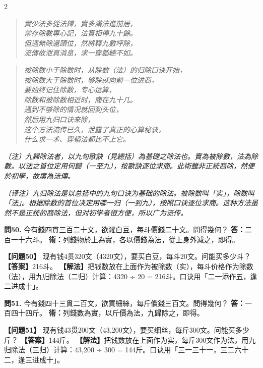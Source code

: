 \documentclass[11pt,a4paper]{article}
\newcommand{\rhymeCL}[1]{%
  \begin{quote}\itshape\color{verselinecolor}#1\end{quote}
}
\newcommand{\rhymeMOD}[1]{%
  \begin{quote}\itshape\color{verselinecolor}#1\end{quote}
}
\newcommand{\noteCL}[1]{\par\textcolor{notecolor}{\small\textit{〔注〕#1}}\par\smallskip}
\newcommand{\noteMOD}[1]{\par\textcolor{notecolor}{\small\textit{〔译注〕#1}}\par\smallskip}
\begin{document}
\begin{paracol}{2}
\rhymeCL{實少法多從法歸，實多滿法進前居，\\
常存除數專心記，法實相停九十餘。\\
但遇無除還頭位，然將釋九數呼除，\\
流傳故泄真消息，求一穿韜總不如。}
\switchcolumn
\rhymeMOD{被除数小于除数时，从除数（法）的归除口诀开始，\\
被除数大于除数时，够除就向前一位进商，\\
要始终记住除数，专心运算，\\
除数和被除数相近时，商在九十几。\\
遇到不够除的情况就回到头位，\\
然后用九归口诀来除，\\
这个方法流传已久，泄露了真正的心算秘诀，\\
什么求一术、穿韬法都比不上它。}
\switchcolumn*
\noteCL{九歸除法者，以九句歌訣（見總括）為基礎之除法也。實為被除數，法為除數。以法之首位定用何歸（一至九），按歌訣逐位求商。此術雖非正統商除，然便於初學，故廣為流傳。}
\switchcolumn
\noteMOD{九归除法是以总括中的九句口诀为基础的除法。被除数叫「实」，除数叫「法」。根据除数的首位决定用哪一归（一到九），按照口诀逐位求商。这种方法虽然不是正统的商除法，但对初学者很方便，所以广为流传。}

\switchcolumn*

\textbf{問50.} 今有錢四貫三百二十文，欲糴白豆，每斗價錢二十文。問得幾何？\break
\textbf{答：}二百一十六斗。\break
\textbf{術：}列錢物於上為實，各以價錢為法，從上身外減之，即得。

\switchcolumn

\textbf{【问题50】} 现有钱4贯320文（4320文），要买白豆，每斗20文。问能买多少斗？\break
\textbf{【答案】}216斗。\break
\textbf{【解法】}把钱数放在上面作为被除数（实），每斗价格作为除数（法），用九归除法（二归）计算：4320 ÷ 20 = 216斗。口诀用「二一添作五，逢二进成十」。

\switchcolumn*

\textbf{問51.} 今有錢四十三貫二百文，欲買細絲，每斤價錢三百文。問得幾何？\break
\textbf{答：}一百四十四斤。\break
\textbf{術：}列錢數為實，以斤價為法，九歸除之，即得。

\switchcolumn

\textbf{【问题51】} 现有钱43贯200文（43,200文），要买细丝，每斤300文。问能买多少斤？\break
\textbf{【答案】}144斤。\break
\textbf{【解法】}把钱数放在上面作为实，每斤300文作为法，用九归除法（三归）计算：43,200 ÷ 300 = 144斤。口诀用「三一三十一，三二六十二，逢三进成十」。


\end{paracol}
\end{document}
